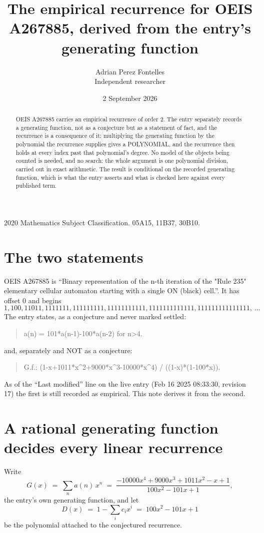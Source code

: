 \documentclass[11pt,a4paper]{article}
\title{The empirical recurrence for OEIS A267885, derived from the entry's generating function}
\author{Adrian Perez Fontelles\\ \small Independent researcher}
\date{2 September 2026}
\theoremstyle{plain}
\theoremstyle{definition}
\begin{document}
\maketitle

\begin{abstract}
OEIS A267885 carries an empirical recurrence of order $2$. The entry separately records a
generating function, not as a conjecture but as a statement of fact, and the recurrence is a
consequence of it: multiplying the generating function by the polynomial the recurrence
supplies gives a POLYNOMIAL, and the recurrence then holds at every index past that
polynomial's degree. No model of the objects being counted is needed, and no search: the
whole argument is one polynomial division, carried out in exact arithmetic. The result is
conditional on the recorded generating function, which is what the entry asserts and what is
checked here against every published term.
\end{abstract}

\noindent\small 2020 Mathematics Subject Classification. 05A15, 11B37, 30B10.\normalsize

\section{The two statements}

OEIS A267885 is ``Binary representation of the n-th iteration of the "Rule 235" elementary cellular automaton starting with a single ON (black) cell.''. It has offset $0$ and begins
\[
1, 100, 11011, 1111111, 111111111, 11111111111, 1111111111111, 111111111111111,\ \dots
\]
The entry states, as a conjecture and never marked settled:
\begin{quote}
a(n) = 101*a(n-1)-100*a(n-2) for n>4.
\end{quote}
and, separately and NOT as a conjecture:
\begin{quote}
G.f.: (1-x+1011*x\^{}2+9000*x\^{}3-10000*x\^{}4) / ((1-x)*(1-100*x)).
\end{quote}
As of the ``Last modified'' line on the live entry (Feb 16 2025 08:33:30, revision 17) the first is still
recorded as empirical. This note derives it from the second.

\section{A rational generating function decides every linear recurrence}

Write
\[
G(x)\;=\;\sum_{n}a(n)\,x^{n}\;=\;\frac{- 10000 x^{4} + 9000 x^{3} + 1011 x^{2} - x + 1}{100 x^{2} - 101 x + 1},
\]
the entry's own generating function, and let
\[
D(x)\;=\;1-\sum_i c_i x^{i}\;=\;100 x^{2} - 101 x + 1
\]
be the polynomial attached to the conjectured recurrence.
\end{document}
